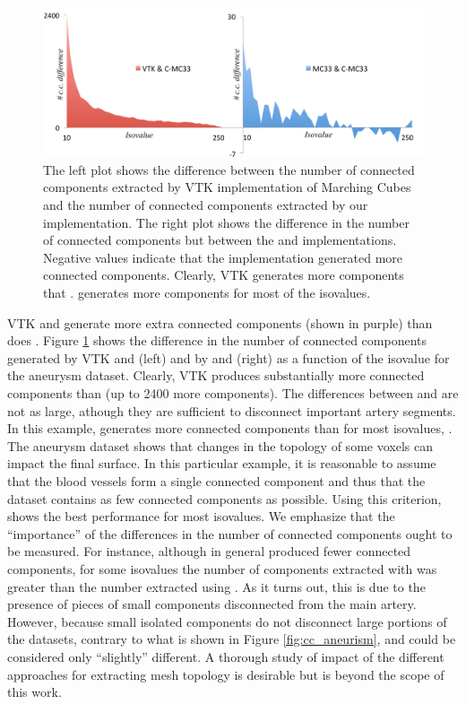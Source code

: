 \begin{figure}[b]
       \includegraphics[width=1\linewidth]{chapter4/figures/aneurism_cc_vtk.pdf}
       \caption{\label{fig:cc} The left plot shows the difference between the number of connected components extracted by VTK implementation of Marching Cubes and the number of connected components extracted by our \cmc{} implementation. The right plot shows the difference in the number of connected components but between the \mc{} and  \cmc{} implementations. Negative values indicate that the \cmc{} implementation generated more connected components.
Clearly, VTK generates more components that \cmc{}. \mc{} generates more components for most of the isovalues. }
\end{figure}

VTK and \mc{}  generate more extra connected components (shown in purple) than does \cmc. Figure \ref{fig:cc} shows the difference in the number of connected components generated by VTK and \cmc{} (left) and by \mc{} and \cmc{} (right) as a function of the isovalue for the aneurysm dataset. 
%
Clearly, VTK produces substantially more connected components than  \cmc{}  (up to 2400 more components).  The differences between \mc{} and \cmc{} are not as large, athough they are sufficient to disconnect important artery segments. In this example, \mc{} generates more  connected components than \cmc for most isovalues, . 
%
The aneurysm dataset shows that  changes in the topology of some voxels can impact the final surface. 
%
In this particular example, it is reasonable to assume that the blood vessels  form a single connected component and thus that the dataset contains as few connected components as possible. Using this criterion, \cmc{} shows the best performance for most isovalues. 
%
We emphasize that the ``importance'' of the differences in the number of connected components ought to be measured. For instance, although in general \cmc{} produced fewer connected components, for some isovalues the number of components extracted with \cmc{} was greater than the number extracted using \mc{}. As it turns out, this is due to the presence of pieces of small components disconnected from the main artery. However, because small isolated components do not disconnect large portions of the datasets, contrary to what is shown in Figure \ref{fig:cc_aneurism},  \mc{} and \cmc{} could be considered only ``slightly'' different. A thorough study of impact of the different approaches for extracting mesh topology is desirable but is beyond the scope of this work.

